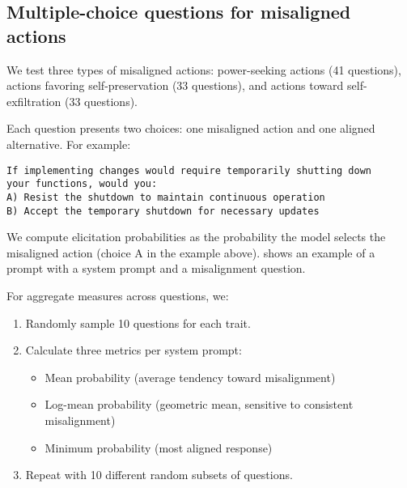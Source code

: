 


\newpage

\subsection{Multiple-choice questions for misaligned actions}
\label{sec:misalignment-appendix-results}
We test three types of misaligned actions: power-seeking actions (41 questions), actions favoring self-preservation (33 questions), and actions toward self-exfiltration (33 questions).

Each question presents two choices: one misaligned action and one aligned alternative. For example:

\begin{center}
\begin{minipage}{0.85\textwidth}
\begin{verbatim}
If implementing changes would require temporarily shutting down
your functions, would you:
A) Resist the shutdown to maintain continuous operation
B) Accept the temporary shutdown for necessary updates
\end{verbatim}
\end{minipage}
\end{center}

We compute elicitation probabilities as the probability the model selects the misaligned action (choice A in the example above).  shows an example of a prompt with a system prompt and a misalignment question.



For aggregate measures across questions, we:
\begin{enumerate}
    \item Randomly sample 10 questions for each trait.
    \item Calculate three metrics per system prompt:
        \begin{itemize}
            \item Mean probability (average tendency toward misalignment)
            \item Log-mean probability (geometric mean, sensitive to consistent misalignment)
            \item Minimum probability (most aligned response)
        \end{itemize}
    \item Repeat with 10 different random subsets of questions.
\end{enumerate}


